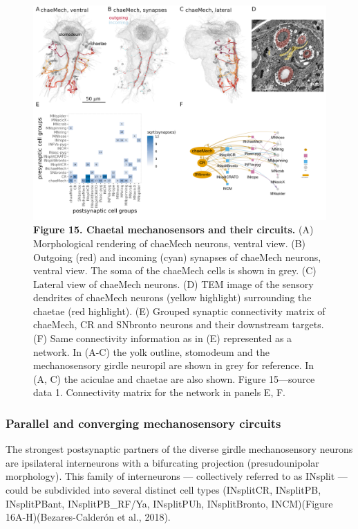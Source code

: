 \documentclass[
  11pt,
]{article}
\begin{document}
\begin{figure}[H]

{\centering \includegraphics[width=1\textwidth,height=\textheight]{Figures/Figure15.png}

}

\caption{\textbf{Figure 15. Chaetal mechanosensors and their circuits.}
(A) Morphological rendering of chaeMech neurons, ventral view. (B)
Outgoing (red) and incoming (cyan) synapses of chaeMech neurons, ventral
view. The soma of the chaeMech cells is shown in grey. (C) Lateral view
of chaeMech neurons. (D) TEM image of the sensory dendrites of chaeMech
neurons (yellow highlight) surrounding the chaetae (red highlight). (E)
Grouped synaptic connectivity matrix of chaeMech, CR and SNbronto
neurons and their downstream targets. (F) Same connectivity information
as in (E) represented as a network. In (A-C) the yolk outline, stomodeum
and the mechanosensory girdle neuropil are shown in grey for reference.
In (A, C) the aciculae and chaetae are also shown. Figure 15---source
data 1. Connectivity matrix for the network in panels E, F.}

\end{figure}%

\subsubsection{Parallel and converging mechanosensory
circuits}\label{parallel-and-converging-mechanosensory-circuits}

The strongest postsynaptic partners of the diverse girdle mechanosensory
neurons are ipsilateral interneurons with a bifurcating projection
(presudounipolar morphology). This family of interneurons ---
collectively referred to as INsplit --- could be subdivided into several
distinct cell types (INsplitCR, INsplitPB, INsplitPBant,
INsplitPB\_RF/Ya, INsplitPUh, INsplitBronto, INCM)(Figure
16A-H)(Bezares-Calderón et al., 2018).
\end{document}
